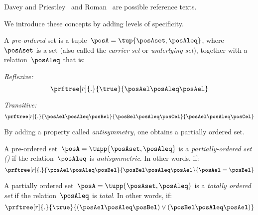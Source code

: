Davey and Priestley~\cite{davey02} and Roman~\cite{roman08} are possible reference texts.

We introduce these concepts by adding levels of specificity.

\begin{definition}
    \label{def:preorder}
    A \emph{pre-ordered} set is a tuple~$\posA = \tup{\posAset,\posAleq}$, where~$\posAset$ is a set (also called the \emph{carrier set} or \emph{underlying set}), together with a relation~$\posAleq$ that is:
    \begin{compactitem}
        \item \emph{Reflexive:}
        \begin{equation}
            \prftree[r]{.}{\true}{\posAel \posAleq \posAel}
        \end{equation}
        \item \emph{Transitive:}
        \begin{equation}
            \prftree[r]{.}{\posAel \posAleq \posBel}{\posBel \posAleq \posCel}{\posAel \posAleq \posCel}
        \end{equation}
    \end{compactitem}
\end{definition}
By adding a property called \emph{antisymmetry}, one obtains a partially ordered set.
\begin{ctdefinition}
    \label{def:poset}
    A pre-ordered set~$\posA = \tupp{\posAset,\posAleq}$ is a \emph{partially-ordered set ()} if the relation~$\posAleq$ is \emph{antisymmetric}.
    In other words, if:
    \begin{equation}
        \prftree[r]{.}{\posAel \posAleq \posBel}{\posBel \posAleq \posAel}{\posAel = \posBel}
    \end{equation}
\end{ctdefinition}

\begin{ctdefinition}
    \label{def:total_order}
    A partially ordered set~$\posA = \tupp{\posAset,\posAleq}$ is a \emph{totally ordered set} if the relation~$\posAleq$ is \emph{total}.
    In other words, if:
    \begin{equation}
        \prftree[r]{.}{\true}{(\posAel \posAleq \posBel) \vee (\posBel \posAleq \posAel)}
    \end{equation}
\end{ctdefinition}

